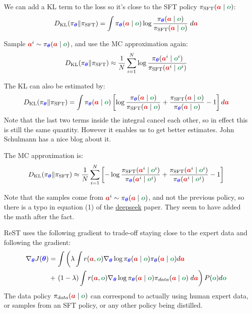 \documentclass{article}
\newcommand{\colsym}[2]{\ensuremath{\textcolor{#1}{\boldsymbol{#2}}}}
\newcommand{\action}{\colsym{red}{a}}
\newcommand{\obs}{\colsym{ForestGreen}{o}}
\newcommand{\params}{\colsym{blue}{\theta}}
\begin{document}
We can add a KL term to the loss so it's close to the SFT policy $\pi_{\text{SFT}}(\action \mid \obs)$:
\[
D_{\text{KL}}(\pi_{\params} \Vert \pi_{\text{SFT}}) = \int \pi_{\params}(\action \mid \obs) \log \frac{\pi_{\params}(\action \mid \obs)}{\pi_{\text{SFT}}(\action \mid \obs)} \; d\action
\]

Sample $\action^i \sim \pi_{\params}(\action \mid \obs)$, and use the MC approximation again:
\[
D_{\text{KL}}(\pi_{\params} \Vert \pi_{\text{SFT}}) \approx \frac{1}{N} \sum_{i=1}^N \log \frac{\pi_{\params}(\action^i \mid \obs^i)}{\pi_{\text{SFT}}(\action^i \mid \obs^i)}
\]



The KL can also be estimated by:
\[
D_{\text{KL}}(\pi_{\params} \Vert \pi_{\text{SFT}}) = \int \pi_{\params}(\action \mid \obs) \left[ \log \frac{\pi_{\params}(\action \mid \obs)}{\pi_{\text{SFT}}(\action \mid \obs)} + \frac{\pi_{\text{SFT}}(\action \mid \obs)}{\pi_{\params}(\action \mid \obs)} - 1 \right] d\action
\]
Note that the last two terms inside the integral cancel each other, so in effect this is still the same quantity. However it enables us to get better estimates. John Schulmann has a nice blog about it.

The MC approximation is:
\[
D_{\text{KL}}(\pi_{\params} \Vert \pi_{\text{SFT}}) \approx \frac{1}{N} \sum_{i=1}^N \left[ - \log \frac{\pi_{\text{SFT}}(\action^i \mid \obs^i)}{\pi_{\params}(\action^i \mid \obs^i)} + \frac{\pi_{\text{SFT}}(\action^i \mid \obs^i)}{\pi_{\params}(\action^i \mid \obs^i)} - 1 \right]
\]

Note that the samples come from  $\action^i \sim \pi_{\params}(\action \mid \obs)$, and not the previous policy, so there is a typo in equation (1) of the \href{https://arxiv.org/abs/2501.12948}{deepseek} paper. They seem to have added the math after the fact.

ReST uses the following gradient to trade-off staying close to the expert data and following the gradient:
\begin{align*}
\nabla_{\params} J(\params)
&= \int \left( \lambda \int r(\action, \obs) \nabla_{\params} \log \pi_{\params}(\action \mid \obs) \pi_{\params}(\action \mid \obs)  d\action \right.  \\ &+ \left. (1-\lambda)
\int r(\action, \obs) \nabla_{\params} \log \pi_{\params}(\action \mid \obs) \pi_{data}(\action \mid \obs) \; d\action \right) P(\obs) d\obs
\end{align*}
The data policy $\pi_{data}(\action \mid \obs)$ can correspond to actually using human expert data, or samples from an SFT policy, or any other policy being distilled.
\end{document}
